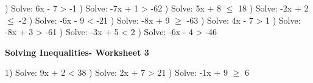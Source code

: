 \documentclass{article}%
\begin{document}
) Solve: 6x - 7 > -1%
\newline%
\newline%
) Solve: -7x + 1 > -62%
\newline%
\newline%
) Solve: 5x + 8 $\leq$ 18%
\newline%
\newline%
) Solve: -2x + 2 $\leq$ -2%
\newline%
\newline%
) Solve: -6x - 9 < -21%
\newline%
\newline%
) Solve: -8x + 9 $\geq$ -63%
\newline%
\newline%
) Solve: 4x - 7 > 1%
\newline%
\newline%
) Solve: -8x + 3 > -61%
\newline%
\newline%
) Solve: -3x + 5 < 2%
\newline%
\newline%
) Solve: -6x - 4 > -46%
\newline%
\newline%
\newline%
\pagebreak%
\large%
\begin{center}%
\textbf{Solving Inequalities- Worksheet 3}%
\newline%
\newline%
\newline%
\end{center} \normalsize%
1) Solve: 9x + 2 < 38%
\newline%
\newline%
) Solve: 2x + 7 > 21%
\newline%
\newline%
) Solve: -1x + 9 $\geq$ 6%
\newline%
\newline%
\end{document}
